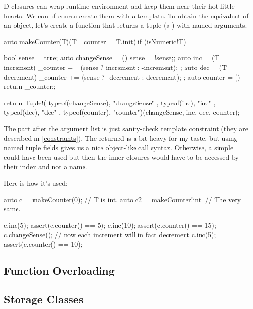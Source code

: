 D closures can wrap runtime environment and keep them near their hot little hearts. We can of course create them with a template. To obtain the equivalent of an object, let's create a function that returns a tuple (a ) with named arguments.

\begin{dcode}
auto makeCounter(T)(T _counter = T.init) if (isNumeric!T)
{
    bool sense = true;
    auto changeSense = () { sense = !sense;};
    auto inc = (T increment) { _counter += (sense ? increment : -increment); };
    auto dec = (T decrement) { _counter += (sense ? -decrement : decrement); };
    auto counter = () { return _counter;};
    
    return Tuple!( typeof(changeSense), "changeSense"
                 , typeof(inc), "inc"
                 , typeof(dec), "dec"
                 , typeof(counter), "counter")(changeSense, inc, dec, counter);
}
\end{dcode}

The  part after the argument list is just sanity-check template constraint (they are described in \autoref{constraints}). The returned  is a bit heavy for my taste, but using named tuple fields gives us a nice object-like call syntax. Otherwise, a simple  could have been used but then the inner closures would have to be accessed by their index and not a name.

Here is how it's used:

\begin{dcode}
auto c = makeCounter(0); // T is int.
auto c2 = makeCounter!int; // The very same.

c.inc(5);
assert(c.counter() == 5);
c.inc(10);
assert(c.counter() == 15);
c.changeSense(); // now each increment will in fact decrement
c.inc(5);
assert(c.counter() == 10);
\end{dcode}

\subsection{Function Overloading}\label{functionsoverloading}


\subsection{Storage Classes}\label{storageclasses}

